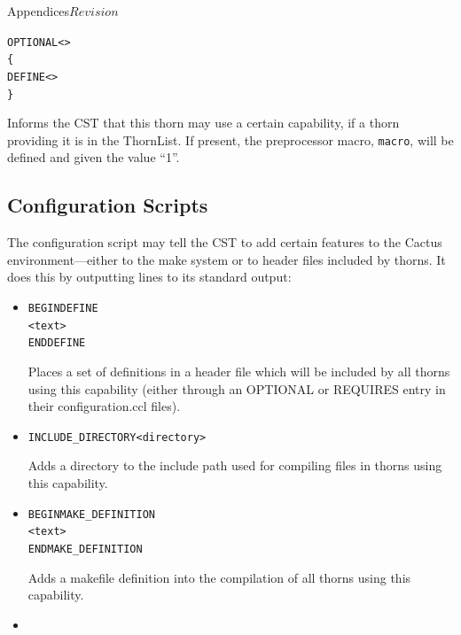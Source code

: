 \begin{cactuspart}{Appendices}{}{$Revision$}
\begin{itemize}
\begin{alltt}
OPTIONAL <>
\{
  DEFINE <>
\}
\end{alltt}

Informs the CST that this thorn may use a certain capability, if a
thorn providing it is in the ThornList.  If present, the preprocessor
macro, \verb|macro|, will be defined and given the value ``1''.

\end{itemize}

\subsection{Configuration Scripts}
\label{sec:Appendix.configuration.ccl.configscript}

The configuration script may tell the CST to add certain features to
the Cactus environment---either to the make system or to header
files included by thorns.  It does this by outputting lines to its
standard output:

\begin{itemize}


\item

\begin{alltt}
BEGIN DEFINE 
<text>
END DEFINE
\end{alltt}

Places a set of definitions in a header file which will be included by
all thorns using this capability (either through an OPTIONAL or
REQUIRES entry in their configuration.ccl files).

\item

\begin{alltt}
INCLUDE_DIRECTORY  <directory>
\end{alltt}

Adds a directory to the include path used for compiling files in
thorns using this capability.

\item

\begin{alltt}
BEGIN MAKE_DEFINITION 
<text>
END MAKE_DEFINITION
\end{alltt}

Adds a makefile definition into the compilation of all thorns using
this capability.

\item


\end{itemize}
\end{cactuspart}
